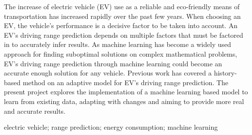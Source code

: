 \abstractEN %



The increase of electric vehicle (EV) use as a reliable and
eco-friendly means of transportation has increased rapidly over
the past few years.
When choosing an EV, the vehicle's performance is a decisive factor
to be taken into account.
An EV's driving range prediction depends on multiple factors that must
be factored in to accurately infer results.
As machine learning has become a widely used approach for
finding suboptimal solutions on complex mathematical problems,
EV's driving range prediction through machine learning
could become an accurate enough solution for any vehicle.
Previous work has covered a history-based method on an adaptive model
for EV's driving range prediction.
The present project explores the implementation of a machine learning
based model to learn from existing data, adapting with changes
and aiming to provide more real and accurate results.


%
%
%
%
%
%
%
%

\begin{keywords}
    electric vehicle;
    range prediction;
    energy consumption;
    machine learning
\end{keywords} 
